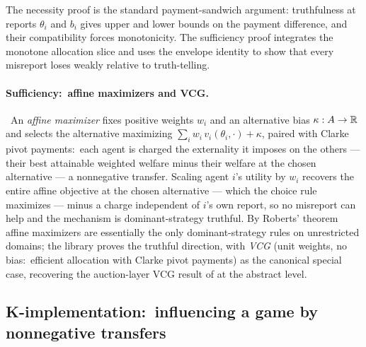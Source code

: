 \noindent The necessity proof is the standard payment-sandwich
argument: truthfulness at reports $\theta_i$ and $b_i$ gives upper and
lower bounds on the payment difference, and their compatibility forces
monotonicity.  The sufficiency proof integrates the monotone
allocation slice and uses the envelope identity to show that every
misreport loses weakly relative to truth-telling.


\paragraph{Sufficiency:\ affine maximizers and VCG.}\
An \emph{affine maximizer} fixes positive weights $w_i$ and an
alternative bias $\kappa : A \to \mathbb{R}$ and selects the alternative
maximizing $\sum_i w_i\,v_i(\theta_i, \cdot) + \kappa$, paired with
Clarke pivot payments:\ each agent is charged the externality it
imposes on the others — their best attainable weighted welfare minus
their welfare at the chosen alternative — a nonnegative transfer.
Scaling agent $i$'s utility by $w_i$ recovers the entire affine
objective at the chosen alternative — which the choice rule maximizes —
minus a charge independent of $i$'s own report, so no misreport can
help and the mechanism is dominant-strategy truthful.  By Roberts'
theorem~\citep{Roberts1979} affine maximizers are essentially the only
dominant-strategy rules on unrestricted domains; the library proves the
truthful direction, with \emph{VCG} (unit weights, no bias:\ efficient
allocation with Clarke pivot payments) as the canonical special case,
recovering the auction-layer VCG result of \Cref{sec:mech:auctions} at
the abstract level.


\subsection{K-implementation:\ influencing a game by nonnegative
transfers}
\label{sec:mech:kimplementation}

